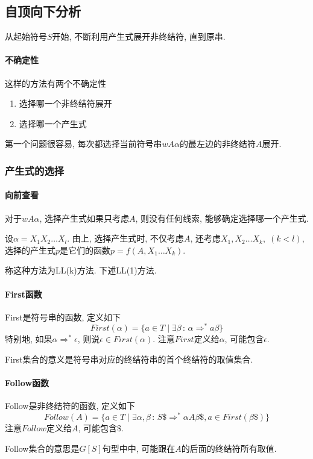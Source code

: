 \documentclass{ctexart}
\begin{document}
\subsection{自顶向下分析}
    从起始符号$S$开始, 不断利用产生式展开非终结符, 直到原串.\par
\paragraph{不确定性} 这样的方法有两个不确定性 \begin{enumerate}
        \item 选择哪一个非终结符展开
        \item 选择哪一个产生式
    \end{enumerate}\par
    第一个问题很容易, 每次都选择当前符号串$w A \alpha$的最左边的非终结符$A$展开.
\subsubsection{产生式的选择}
\paragraph{向前查看} 对于$wA\alpha$, 选择产生式如果只考虑$A$, 则没有任何线索, 能够确定选择哪一个产生式.\par
    设$\alpha = X_1 X_2 \ldots X_l$.
    由上, 选择产生式时,
    不仅考虑$A$, 还考虑$X_1, X_2 \ldots X_k,\; (k < l)$,
    选择的产生式$p$是它们的函数$p = f(A, X_1 \ldots X_k)$.\par
    称这种方法为LL(k)方法. 下述LL(1)方法.
\paragraph{First函数} First是符号串的函数, 定义如下\[
    First(\alpha) = \{a \in T \;|\; \exists \beta\,:\,\alpha \Rightarrow^* a\beta\}\]
    特别地, 如果$\alpha \Rightarrow^* \epsilon$, 则说$\epsilon \in First(\alpha)$.
    注意$First$定义给$\alpha$, 可能包含$\epsilon$.\par
    First集合的意义是符号串对应的终结符串的首个终结符的取值集合.
\paragraph{Follow函数} Follow是非终结符的函数, 定义如下\[
    Follow(A) = \{a \in T \;|\; \exists \alpha, \beta \,:\, S\$ \Rightarrow^* \alpha A \beta\$, a \in First(\beta\$)\}
    \]
    注意$Follow$定义给$A$, 可能包含$\$$.\par
    Follow集合的意思是$G[S]$句型中中, 可能跟在$A$的后面的终结符所有取值.
\end{document}
